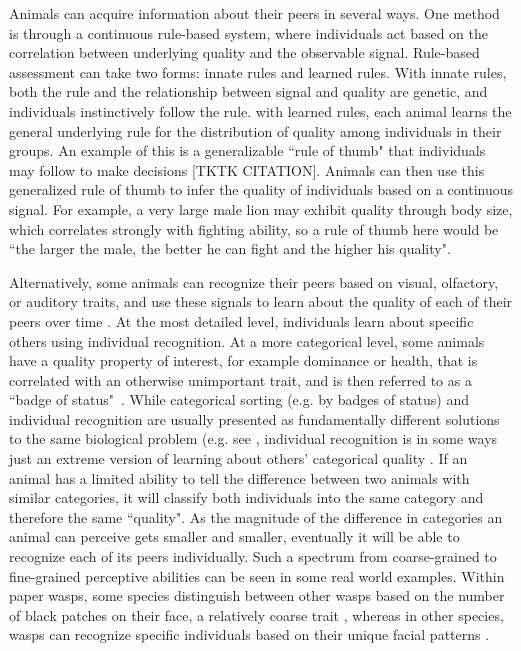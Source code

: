 Animals can acquire information about their peers in several ways. One method is through a continuous rule-based system, where individuals act based on the correlation between underlying quality and the observable signal. Rule-based assessment can take two forms: innate rules and learned rules. With innate rules, both the rule and the relationship between signal and quality are genetic, and individuals instinctively follow the rule. with learned rules, each animal learns the general underlying rule for the distribution of quality among individuals in their groups. An example of this is a generalizable ``rule of thumb" that individuals may follow to make decisions [TKTK CITATION]. Animals can then use this generalized rule of thumb to infer the quality of individuals based on a continuous signal. For example, a very large male lion may exhibit quality through body size, which correlates strongly with fighting ability, so a rule of thumb here would be ``the larger the male, the better he can fight and the higher his quality".  

Alternatively, some animals can recognize their peers based on visual, olfactory, or auditory traits, and use these signals to learn about the quality of each of their peers over time \citep{sheehan2016evotradeoff}. At the most detailed level, individuals learn about specific others using individual recognition. At a more categorical level, some animals have a quality property of interest, for example dominance or health, that is correlated with an otherwise unimportant trait, and is then referred to as a ``badge of status"~\citep{dawkins1978signals,Rohwer:1981vn,Rohwer:1982fk}. While categorical sorting (e.g. by badges of status) and individual recognition are usually presented as fundamentally different solutions to the same biological problem (e.g. see \citep{sheehan2016evotradeoff}, individual recognition is in some ways just an extreme version of learning about others' categorical quality \citep{Barnard:1979fk}. If an animal has a limited ability to tell the difference between two animals with similar categories, it will classify both individuals into the same category and therefore the same ``quality". As the magnitude of the difference in categories an animal can perceive gets smaller and smaller, eventually it will be able to recognize each of its peers individually. Such a spectrum from coarse-grained to fine-grained perceptive abilities can be seen in some real world examples. Within paper wasps, some species distinguish between other wasps based on the number of black patches on their face, a relatively coarse trait \citep{Tibbetts:2004kx}, whereas in other species, wasps can recognize specific individuals based on their unique facial patterns \citep{Tibbetts:2002ys}. 

